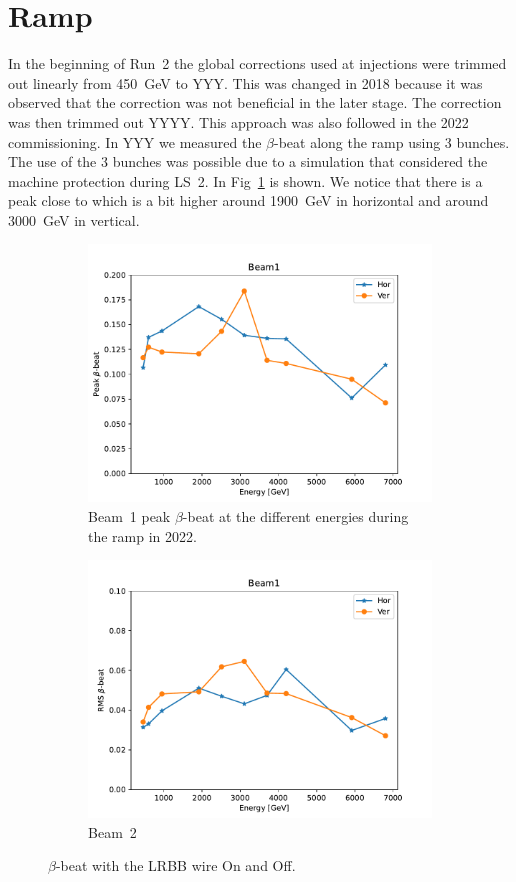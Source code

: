 \documentclass{cernatsnote}
\begin{document}
\section{Ramp}
In the beginning of Run~2 the global corrections used at injections were trimmed out linearly from 450~GeV to YYY. This was changed in 2018 because it was observed that the correction was not beneficial in the later stage. The correction was then trimmed out YYYY. This approach was also followed in the 2022 commissioning. In YYY we measured the $\beta$-beat along the ramp using 3 bunches. The use of the 3 bunches was possible due to a simulation that considered the machine protection during LS~2\cite{}. In Fig~\ref{fig:ramp_peak_rms} is shown. We notice that there is a peak close to which is a bit higher around 1900~GeV in horizontal and around 3000~GeV in vertical. 

\begin{figure}[ht]
\begin{subfigure}{.5\textwidth}
  \centering
  \includegraphics[width=.8\linewidth]{ramp/Beam1_peak_filter.pdf}  
  \caption{Beam~1 peak $\beta$-beat at the different energies during the ramp in 2022.}
\end{subfigure}
\begin{subfigure}{.5\textwidth}
  \centering
  \includegraphics[width=.8\linewidth]{ramp/Beam1_rms_filter.pdf}  
  \caption{Beam~2}
\end{subfigure}
\caption{$\beta$-beat with the LRBB wire On and Off.}
\label{fig:ramp_peak_rms}
\end{figure}
\end{document}
